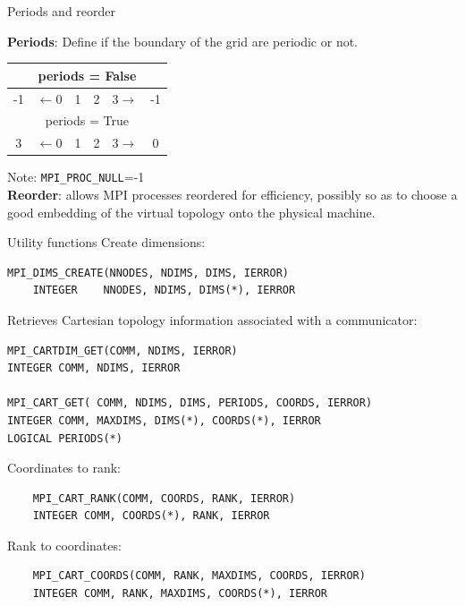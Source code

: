 \documentclass[aspectratio=43]{beamer}
\begin{document}
\begin{frame}[fragile]{Periods and reorder}

\textbf{Periods}: Define if the boundary of the grid are periodic or not.\\
\begin{center}
\begin{tabular}{cccccc}
    \multicolumn{6}{c}{periods = False} \\\hline
    \color{cscsred}-1 & $\leftarrow$\color{cscsblue}0 &\color{cscsblue}1 & \color{cscsblue}2 & {\color{cscsblue}3}$\rightarrow$ & \color{cscsred}-1\\\hline
    \multicolumn{6}{c}{periods = True} \\\hline
    \color{cscsred}3 & $\leftarrow$\color{cscsblue}0 & \color{cscsblue}1 & \color{cscsblue}2 & {\color{cscsblue}3}$\rightarrow$ & \color{cscsred}0\\\hline
\end{tabular}
\end{center}
Note: \verb+MPI_PROC_NULL+=-1\\[0.3cm]

\textbf{Reorder}: allows MPI processes reordered for efficiency, possibly so as to choose a good embedding of the virtual topology onto the physical machine.

\end{frame}

\begin{frame}[fragile]{Utility functions}
Create dimensions:
\footnotesize
\begin{verbatim}
MPI_DIMS_CREATE(NNODES, NDIMS, DIMS, IERROR)
    INTEGER    NNODES, NDIMS, DIMS(*), IERROR
\end{verbatim}
\normalsize
Retrieves Cartesian topology information associated with a communicator:
\footnotesize
\begin{verbatim}
MPI_CARTDIM_GET(COMM, NDIMS, IERROR)
INTEGER COMM, NDIMS, IERROR

MPI_CART_GET( COMM, NDIMS, DIMS, PERIODS, COORDS, IERROR)
INTEGER COMM, MAXDIMS, DIMS(*), COORDS(*), IERROR
LOGICAL PERIODS(*)
\end{verbatim}
\normalsize
Coordinates to rank:
\footnotesize
\begin{verbatim}
    MPI_CART_RANK(COMM, COORDS, RANK, IERROR)
    INTEGER COMM, COORDS(*), RANK, IERROR
\end{verbatim}
\normalsize
Rank to coordinates:
\footnotesize
\begin{verbatim}
    MPI_CART_COORDS(COMM, RANK, MAXDIMS, COORDS, IERROR)
    INTEGER COMM, RANK, MAXDIMS, COORDS(*), IERROR
\end{verbatim}
\end{frame}
\end{document}
